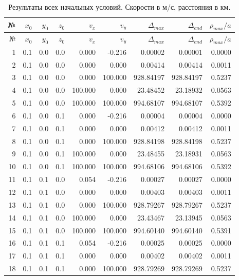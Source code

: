 \begin{longtable}{rrrrrrrrr}
    \caption{Результаты всех начальных условий. Скорости в м/с, расстояния в км.}\\
    \toprule № & $x_0$ & $y_0$ & $z_0$ & $v_x$ & $v_y$ & $\Delta_{max}$ & $\Delta_{end}$ & $\rho_{max}/a$ \\
    \midrule
    \endfirsthead
    \toprule № & $x_0$ & $y_0$ & $z_0$ & $v_x$ & $v_y$ & $\Delta_{max}$ & $\Delta_{end}$ & $\rho_{max}/a$ \\
    \midrule
    \endhead
    1 & 0.1 & 0.0 & 0.0 & 0.000 & -0.216 & 0.00002 & 0.00001 & 0.0000 \\
    2 & 0.1 & 0.0 & 0.0 & 0.000 & 0.000 & 0.00414 & 0.00414 & 0.0011 \\
    3 & 0.1 & 0.0 & 0.0 & 0.000 & 100.000 & 928.84197 & 928.84197 & 0.5237 \\
    4 & 0.1 & 0.0 & 0.0 & 100.000 & 0.000 & 23.48452 & 23.18932 & 0.0563 \\
    5 & 0.1 & 0.0 & 0.0 & 100.000 & 100.000 & 994.68107 & 994.68107 & 0.5392 \\
    6 & 0.1 & 0.0 & 0.1 & 0.000 & -0.216 & 0.00004 & 0.00004 & 0.0000 \\
    7 & 0.1 & 0.0 & 0.1 & 0.000 & 0.000 & 0.00412 & 0.00412 & 0.0011 \\
    8 & 0.1 & 0.0 & 0.1 & 0.000 & 100.000 & 928.84198 & 928.84198 & 0.5237 \\
    9 & 0.1 & 0.0 & 0.1 & 100.000 & 0.000 & 23.48455 & 23.18931 & 0.0563 \\
    10 & 0.1 & 0.0 & 0.1 & 100.000 & 100.000 & 994.68106 & 994.68106 & 0.5392 \\
    11 & 0.1 & 0.1 & 0.0 & 0.054 & -0.216 & 0.00027 & 0.00027 & 0.0000 \\
    12 & 0.1 & 0.1 & 0.0 & 0.000 & 0.000 & 0.00403 & 0.00403 & 0.0011 \\
    13 & 0.1 & 0.1 & 0.0 & 0.000 & 100.000 & 928.79267 & 928.79267 & 0.5237 \\
    14 & 0.1 & 0.1 & 0.0 & 100.000 & 0.000 & 23.43467 & 23.13945 & 0.0563 \\
    15 & 0.1 & 0.1 & 0.0 & 100.000 & 100.000 & 994.60140 & 994.60140 & 0.5391 \\
    16 & 0.1 & 0.1 & 0.1 & 0.054 & -0.216 & 0.00025 & 0.00025 & 0.0000 \\
    17 & 0.1 & 0.1 & 0.1 & 0.000 & 0.000 & 0.00402 & 0.00402 & 0.0011 \\
    18 & 0.1 & 0.1 & 0.1 & 0.000 & 100.000 & 928.79269 & 928.79269 & 0.5237 \\

\end{longtable}
